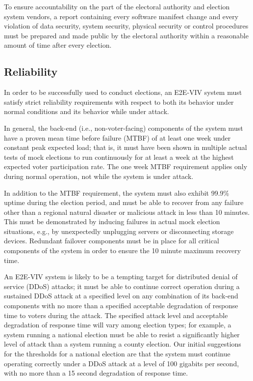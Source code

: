 To ensure accountability on the part of the electoral authority and
election system vendors, a report containing every software manifest
change and every violation of data security, system security, physical
security or control procedures must be prepared and made public by the
electoral authority within a reasonable amount of time after every
election.

\subsection{Reliability}

In order to be successfully used to conduct elections, an E2E-VIV
system must satisfy strict reliability requirements with respect to
both its behavior under normal conditions and its behavior while under
attack.

In general, the back-end (i.e., non-voter-facing) components of the
system must have a proven mean time before failure (MTBF) of at least
one week under constant peak expected load; that is, it must have been
shown in multiple actual tests of mock elections to run continuously
for at least a week at the highest expected voter participation
rate. The one week MTBF requirement applies only during normal
operation, not while the system is under attack.

In addition to the MTBF requirement, the system must also exhibit
99.9\% uptime during the election period, and must be able to recover
from any failure other than a regional natural disaster or malicious
attack in less than 10 minutes. This must be demonstrated by inducing
failures in actual mock election situations, e.g., by unexpectedly
unplugging servers or disconnecting storage devices. Redundant
failover components must be in place for all critical components of
the system in order to ensure the 10 minute maximum recovery time.

An E2E-VIV system is likely to be a tempting target for distributed
denial of service (DDoS) attacks; it must be able to continue correct
operation during a sustained DDoS attack at a specified level on any
combination of its back-end components with no more than a specified
acceptable degradation of response time to voters during the
attack. The specified attack level and acceptable degradation of
response time will vary among election types; for example, a system
running a national election must be able to resist a significantly
higher level of attack than a system running a county election. Our
initial suggestions for the thresholds for a national election are
that the system must continue operating correctly under a DDoS attack
at a level of 100 gigabits per second, with no more than a 15 second
degradation of response time.

